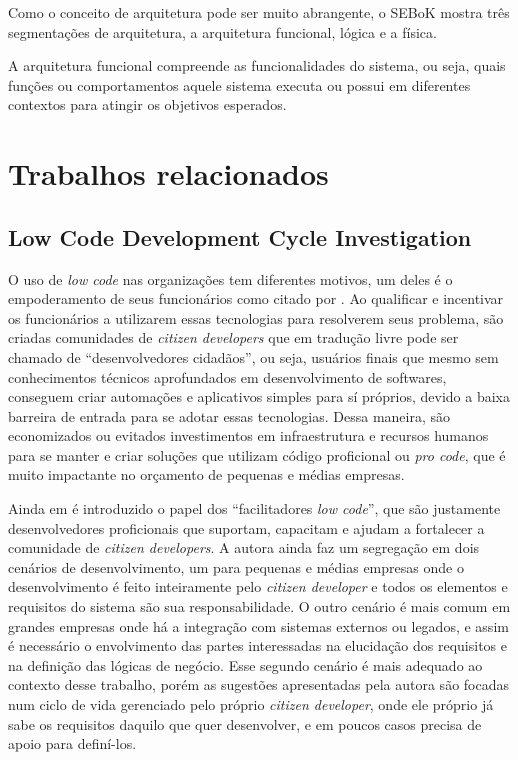 	Como o conceito de arquitetura pode ser muito abrangente, o SEBoK \citep{sebok2024} mostra três segmentações de arquitetura, a arquitetura funcional,	lógica e a física.

	A arquitetura funcional compreende as funcionalidades do sistema, ou seja, quais funções ou comportamentos aquele sistema executa ou possui em diferentes contextos para atingir os objetivos
	esperados.
	
	{\color{blue}
	\section{Trabalhos relacionados}
		
		\subsection{Low Code Development Cycle Investigation}
		O uso de \textit{low code} nas organizações tem diferentes motivos, um deles é o empoderamento de seus funcionários como citado por \cite{LowCodeLifeCicle}. 
		Ao qualificar e incentivar os funcionários a utilizarem essas tecnologias para resolverem seus problema, são criadas comunidades de \textit{citizen developers} que em tradução
		livre pode ser chamado de ``desenvolvedores cidadãos'', ou seja, usuários finais que mesmo sem conhecimentos técnicos aprofundados em desenvolvimento de softwares, conseguem criar
		automações e aplicativos simples para sí próprios, devido a baixa barreira de entrada para se adotar essas tecnologias. Dessa maneira, são economizados ou evitados investimentos em
		infraestrutura e recursos humanos para se manter e criar soluções que utilizam código proficional ou \textit{pro code}, que é muito impactante no orçamento de pequenas e médias empresas.

		Ainda em \cite{LowCodeLifeCicle} é introduzido o papel dos ``facilitadores \textit{low code}'', que são justamente desenvolvedores proficionais que suportam, capacitam e ajudam a
		fortalecer a comunidade de \textit{citizen developers}. A autora ainda faz um segregação em dois cenários de desenvolvimento, um para pequenas e médias empresas onde o desenvolvimento
		é feito inteiramente pelo \textit{citizen developer} e todos os elementos e requisitos do sistema são sua responsabilidade. O outro cenário é mais comum em grandes empresas onde há 
		a integração com sistemas externos ou legados, e assim é necessário o envolvimento das partes interessadas na elucidação dos requisitos e na definição das lógicas de negócio. Esse
		segundo cenário é mais adequado ao contexto desse trabalho, porém as sugestões apresentadas pela autora são focadas num ciclo de vida gerenciado pelo próprio \textit{citizen developer},
		onde ele próprio já sabe os requisitos daquilo que quer desenvolver, e em poucos casos precisa de apoio para definí-los.

}
